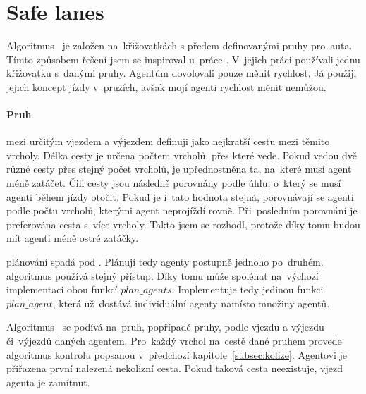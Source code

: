 \section{Safe lanes}\label{sec:safe_lanes}



Algoritmus~ je založen na~křižovatkách s předem definovanými pruhy pro~auta.
Tímto způsobem řešení jsem se inspiroval u~práce \citet{Dresner}.
V~jejich práci používali jednu křižovatku s~danými pruhy.
Agentům dovolovali pouze měnit rychlost.
Já použiji jejich koncept jízdy v~pruzích, avšak mojí agenti rychlost měnit nemůžou.

\paragraph{Pruh}\label{par:pruh} mezi určitým vjezdem a výjezdem definuji jako nejkratší cestu mezi těmito vrcholy.
Délka cesty je určena počtem vrcholů, přes které vede.
Pokud vedou dvě různé cesty přes stejný počet vrcholů, je upřednostněna ta, na~které musí agent méně zatáčet.  %
Čili cesty jsou následně porovnány podle úhlu, o~který se musí agenti během jízdy otočit.
Pokud je i~tato hodnota stejná, porovnávají se agenti podle počtu vrcholů, kterými agent neprojíždí rovně.
Při~posledním porovnání je preferována cesta s~více vrcholy.
Takto jsem se rozhodl, protože díky tomu budou mít agenti méně ostré zatáčky.

\citet{Dresner} plánování spadá pod .
Plánují tedy agenty postupně jednoho po~druhém.
 algoritmus používá stejný přístup.
Díky tomu může spoléhat na~výchozí implementaci obou funkcí $plan\_agents$.
Implementuje tedy jedinou funkci $plan\_agent$, která už~dostává individuální agenty namísto množiny agentů.

Algoritmus~ se podívá na~pruh, popřípadě pruhy, podle vjezdu a výjezdu či~výjezdů daných agentem.
Pro~každý vrchol na~cestě dané pruhem provede algoritmus kontrolu popsanou v~předchozí kapitole~\ref{subsec:kolize}.
Agentovi je přiřazena první nalezená nekolizní cesta.
Pokud taková cesta neexistuje, vjezd agenta je zamítnut.

